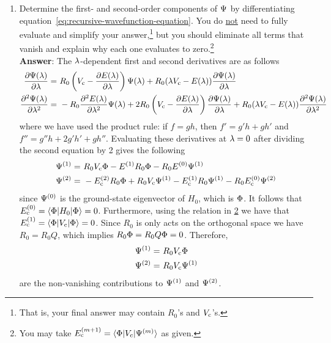 \documentclass[11pt]{article}
\begin{document}
\begin{enumerate}
\newpage
\item
Determine the first- and second-order components of $\Psi $ by differentiating equation~\ref{eq:recursive-wavefunction-equation}.
You do \ul{not} need to fully evaluate and simplify your answer,\footnote{That is, your final answer may contain $R_0$'s and $V_{\mathrm{c}}$'s.} but you should eliminate all terms that vanish and explain why each one evaluates to zero.\footnote{\label{fn:pt-energy}You may take $E_{\mathrm{c}}^{(m+1)}=\langle\Phi |V_{\mathrm{c}}|\Psi ^{(m)}\rangle$ as given.}\\[10pt]
\textbf{Answer}:
The $\lambda $-dependent first and second derivatives are as follows
\begin{align*}
  \frac {\partial\Psi (\lambda )}{\partial\lambda }
=&\
  R_0
  \left(
    V_{\mathrm{c}}
  -
    \frac {\partial E(\lambda )}{\partial\lambda }
  \right)
  \Psi (\lambda )
+
  R_0
  (
    \lambda 
    V_{\mathrm{c}}
  -
    E(\lambda )
  )
  \frac {\partial\Psi (\lambda )}{\partial\lambda }
\\
  \frac {\partial^2\Psi (\lambda )}{\partial\lambda ^2}
=&\
-
  R_0
  \frac {\partial^2E(\lambda )}{\partial\lambda ^2}
  \Psi (\lambda )
+
  2
  R_0
  \left(
    V_{\mathrm{c}}
  -
    \frac {\partial E(\lambda )}{\partial\lambda }
  \right)
  \frac {\partial\Psi (\lambda )}{\partial\lambda }
+
  R_0
  (
    \lambda 
    V_{\mathrm{c}}
  -
    E(\lambda )
  )
  \frac {\partial^2\Psi (\lambda )}{\partial\lambda ^2}
\end{align*}
where we have used the product rule:
if $f=gh$, then $f'=g'h+ gh'$ and $f''=g''h + 2g'h' + gh''$.
Evaluating these derivatives at $\lambda =0$ after dividing the second equation by 2 gives the following
\begin{align*}
  \Psi ^{(1)}
=&\
  R_0
  V_{\mathrm{c}}
  \Phi 
-
  E^{(1)}
  R_0
  \Phi 
-
  R_0
  E^{(0)}
  \Psi ^{(1)}
\\
  \Psi ^{(2)}
=&\
-
  E_{\mathrm{c}}^{(2)}
  R_0
  \Phi 
+
  R_0
  V_{\mathrm{c}}
  \Psi ^{(1)}
-
  E_{\mathrm{c}}^{(1)}
  R_0
  \Psi ^{(1)}
-
  R_0
  E_{\mathrm{c}}^{(0)}
  \Psi ^{(2)}
\end{align*}
since $\Psi ^{(0)}$ is the ground-state eigenvector of $H_0$, which is $\Phi $.
It follows that
$
  E_{\mathrm{c}}^{(0)}
=
  \langle\Phi |H_0|\Phi \rangle
=
  0
$.
Furthermore, using the relation in \cref{fn:pt-energy} we have that
$
  E_{\mathrm{c}}^{(1)}
=
  \langle\Phi |V_{\mathrm{c}}|\Phi \rangle
=
  0
$.
Since $R_0$ is only acts on the orthogonal space we have $R_0=R_0Q$, which implies
$
  R_0
  \Phi 
=
  R_0
  Q
  \Phi 
=
  0
$.
Therefore,
\begin{align*}
  \Psi ^{(1)}
=&\
  R_0
  V_{\mathrm{c}}
  \Phi 
\\
  \Psi ^{(2)}
=&\
  R_0
  V_{\mathrm{c}}
  \Psi ^{(1)}
\end{align*}
are the non-vanishing contributions to $\Psi ^{(1)}$ and $\Psi ^{(2)}$.


\end{enumerate}
\end{document}
